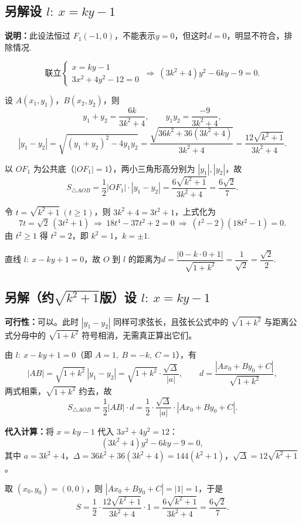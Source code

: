 \documentclass{article}
\begin{document}
\subsection*{另解\quad 设 $l:\ x=ky-1$}

\textbf{说明：}此设法恒过 $F_1(-1,0)$，不能表示$y=0$，但这时$d=0$，明显不符合，排除情况.


\[\text{联立}
\begin{cases}
	x=ky-1\\[2pt]
	3x^2+4y^2-12=0
\end{cases}
\ \Longrightarrow\ (3k^2+4)y^2-6ky-9=0.
\]

设 $A(x_1,y_1)$，$B(x_2,y_2)$，则
\[
y_1+y_2=\frac{6k}{3k^2+4},\qquad y_1y_2=\frac{-9}{3k^2+4},
\]
\[
|y_1-y_2|=\sqrt{(y_1+y_2)^2-4y_1y_2}
=\frac{\sqrt{36k^2+36(3k^2+4)}}{3k^2+4}
=\frac{12\sqrt{k^2+1}}{3k^2+4}.
\]

以 $OF_1$ 为公共底（$|OF_1|=1$），两小三角形高分别为 $|y_1|,|y_2|$，故
\[
S_{\triangle AOB}=\frac12|OF_1|\cdot|y_1-y_2|
=\frac{6\sqrt{k^2+1}}{3k^2+4}=\frac{6\sqrt2}{7}.
\]

令 $t=\sqrt{k^2+1}\ (t\ge1)$，则 $3k^2+4=3t^2+1$，上式化为
\[
7t=\sqrt2\,(3t^2+1)\ \Longrightarrow\ 18t^4-37t^2+2=0
\ \Longrightarrow\ (t^2-2)(18t^2-1)=0.
\]
由 $t^2\ge1$ 得 $t^2=2$，即 $k^2=1$，$k=\pm1$.

直线 $l:\ x-ky+1=0$，故 $O$ 到 $l$ 的距离为$d=\dfrac{|0-k\cdot0+1|}{\sqrt{1+k^2}}=\dfrac{1}{\sqrt2}=\dfrac{\sqrt2}{2}.$

\subsection*{另解（约$\sqrt{k^2+1}$版）\quad 设 $l:\ x=ky-1$}

\textbf{可行性：}可以。此时 $|y_1-y_2|$ 同样可求弦长，且弦长公式中的 $\sqrt{1+k^2}$ 与距离公式分母中的 $\sqrt{1+k^2}$ 符号相消，无需真正算出它们。

由 $l:\ x-ky+1=0$（即 $A=1,\ B=-k,\ C=1$），有
\[
|AB|=\sqrt{1+k^2}\,|y_1-y_2|=\sqrt{1+k^2}\cdot\frac{\sqrt{\Delta}}{|a|},
\qquad
d=\frac{|Ax_0+By_0+C|}{\sqrt{1+k^2}},
\]
两式相乘，$\sqrt{1+k^2}$ 约去，故
\[
S_{\triangle AOB}=\frac12|AB|\cdot d
=\frac12\cdot\frac{\sqrt{\Delta}}{|a|}\cdot|Ax_0+By_0+C|.
\]

\textbf{代入计算：}将 $x=ky-1$ 代入 $3x^2+4y^2=12$：
\[
(3k^2+4)y^2-6ky-9=0,
\]
其中 $a=3k^2+4$，$\Delta=36k^2+36(3k^2+4)=144(k^2+1)$，$\sqrt\Delta=12\sqrt{k^2+1}$。

取 $(x_0,y_0)=(0,0)$，则 $|Ax_0+By_0+C|=|1|=1$，于是
\[
S=\frac12\cdot\frac{12\sqrt{k^2+1}}{3k^2+4}\cdot1
=\frac{6\sqrt{k^2+1}}{3k^2+4}=\frac{6\sqrt2}{7}.
\]
\end{document}
